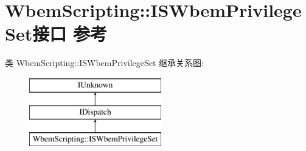 \hypertarget{interface_wbem_scripting_1_1_i_s_wbem_privilege_set}{}\section{Wbem\+Scripting\+:\+:I\+S\+Wbem\+Privilege\+Set接口 参考}
\label{interface_wbem_scripting_1_1_i_s_wbem_privilege_set}
类 Wbem\+Scripting\+:\+:I\+S\+Wbem\+Privilege\+Set 继承关系图\+:\begin{figure}[H]
\begin{center}
\leavevmode
\includegraphics[height=3.000000cm]{interface_wbem_scripting_1_1_i_s_wbem_privilege_set}
\end{center}
\end{figure}

